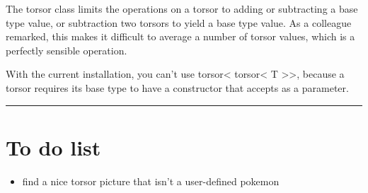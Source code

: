 \documentclass[]{article}
\providecommand{\tightlist}{%
  \setlength{\itemsep}{0pt}\setlength{\parskip}{0pt}}
\begin{document}
The torsor class limits the operations on a torsor to adding or
subtracting a base type value, or subtraction two torsors to yield a
base type value. As a colleague remarked, this makes it difficult to
average a number of torsor values, which is a perfectly sensible
operation.

With the current installation, you can't use torsor\textless{}
torsor\textless{} T \textgreater{}\textgreater{}, because a torsor
requires its base type to have a constructor that accepts as a
parameter.

\begin{center}\rule{0.5\linewidth}{\linethickness}\end{center}

\hypertarget{to-do-list}{%
\section{To do list}\label{to-do-list}}

\begin{itemize}
\tightlist
\item
  find a nice torsor picture that isn't a user-defined pokemon
\end{itemize}
\end{document}
